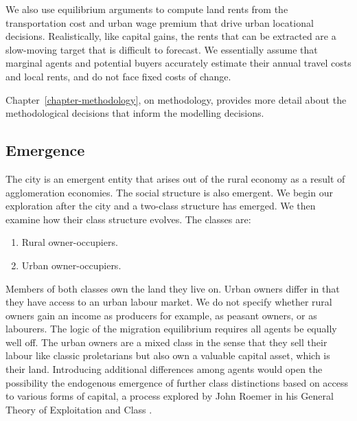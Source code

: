 We also use equilibrium arguments to compute land rents from the transportation cost and urban wage premium that drive urban locational decisions. Realistically, like capital gains, the rents that can be extracted are a slow-moving target that is difficult to forecast. We essentially assume that marginal agents and potential buyers accurately estimate their annual travel costs and local rents, and do not face fixed costs of change.   %

Chapter~\ref{chapter-methodology}, on methodology, provides more detail about the methodological decisions that inform the modelling decisions. 


\subsection{Emergence}



The city is an emergent entity that arises out of the rural economy as a result of agglomeration economies. The social structure is also emergent. We begin our exploration after the city and a two-class structure has emerged. We then examine how their class structure evolves. The classes are:
\begin{enumerate}
    \item Rural owner-occupiers.
    \item Urban owner-occupiers.
\end{enumerate}
Members of both classes own the land they live on. Urban owners differ in that they have access to an urban labour market. We do not specify whether rural owners gain an income as producers for example, as peasant owners, or as labourers. The logic of the migration equilibrium requires all agents be equally well off. The urban owners are a mixed class in the sense that they sell their labour like classic proletarians but also own a valuable capital asset, which is their land. Introducing additional differences among agents would open the possibility  the endogenous emergence of further \gls{class} distinctions based on access to various forms of capital, a process explored by John Roemer in his General Theory of Exploitation and Class \cite{roemerGeneralTheoryExploitation1982}.

